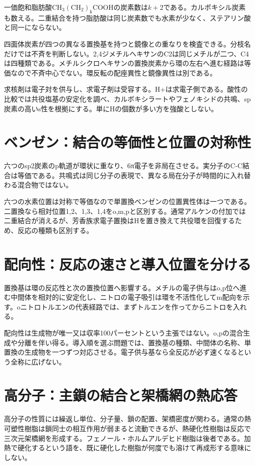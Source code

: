 一価飽和脂肪酸\(\mathrm{CH_3(CH_2)_kCOOH}\)の炭素数は\(k+2\)である。カルボキシル炭素も数える。二重結合を持つ脂肪酸は同じ炭素数でも水素が少なく、ステアリン酸と同一にならない。

四面体炭素が四つの異なる置換基を持つと鏡像との重なりを検査できる\cite{organic_chirality}。分枝名だけでは不斉を判断しない。2,4ジメチルヘキサンのC2は同じメチルが二つ、C4は四種類である。メチルシクロヘキサンの置換炭素から環の左右へ進む経路は等価なので不斉中心でない。環反転の配座異性と鏡像異性は別である。

求核剤は電子対を供与し、求電子剤は受容する。H+は求電子側である。酸性の比較では共役塩基の安定化を調べ、カルボキシラートやフェノキシドの共鳴、sp炭素の高いs性を根拠にする。単にHの個数が多い方を強酸としない。

\section{ベンゼン：結合の等価性と位置の対称性}
\label{theory:organic:benzene}
六つのsp2炭素のp軌道が環状に重なり、6π電子を非局在させる。実分子のC-C結合は等価である。共鳴式は同じ分子の表現で、異なる局在分子が時間的に入れ替わる混合物ではない\cite{organic_benzene}。

六つの水素位置は対称で等価なので単置換ベンゼンの位置異性体は一つである。二置換なら相対位置1,2、1,3、1,4をo,m,pと区別する。通常アルケンの付加では二重結合が消えるが、芳香族求電子置換はHを置き換えて共役環を回復するため、反応の種類も区別する。

\section{配向性：反応の速さと導入位置を分ける}
\label{theory:organic:directing}
置換基は環の反応性と次の置換位置へ影響する。メチルの電子供与はo,p位へ進む中間体を相対的に安定化し、ニトロの電子吸引は環を不活性化してm配向を示す\cite{organic_directing}。oニトロトルエンの代表経路では、まずトルエンを作ってからニトロを入れる。

配向性は生成物が唯一又は収率100パーセントという主張ではない。o,pの混合生成や分離を伴い得る。導入順を選ぶ問題では、置換基の種類、中間体の名称、単置換の生成物を一つずつ対応させる。電子供与基なら全反応が必ず速くなるという全称に広げない。

\section{高分子：主鎖の結合と架橋網の熱応答}
\label{theory:organic:polymer}
高分子の性質には繰返し単位、分子量、鎖の配置、架橋密度が関わる。通常の熱可塑性樹脂は鎖同士の相互作用が弱まると流動できるが、熱硬化性樹脂は反応で三次元架橋網を形成する。フェノール・ホルムアルデヒド樹脂は後者である\cite{organic_physical}。加熱で硬化するという語を、既に硬化した樹脂が何度でも溶けて再成形する意味にしない。

